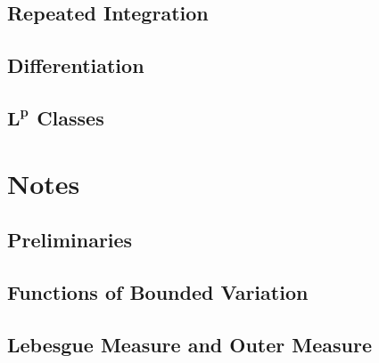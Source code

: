 \documentclass[12pt]{book}
\renewcommand{\.}{\mkern1mu}
\theoremstyle{theorem}
\renewcommand{\bf}[1]{\boldsymbol{#1}}
\begin{document}
\chapter{Repeated Integration}
\chapter{Differentiation}
\chapter{$\bf{L^p}$ Classes}
\part{Notes}
\setcounter{chapter}{0}
\chapter{Preliminaries}
\chapter{Functions of Bounded Variation}
\chapter{Lebesgue Measure and Outer Measure}
\end{document}
